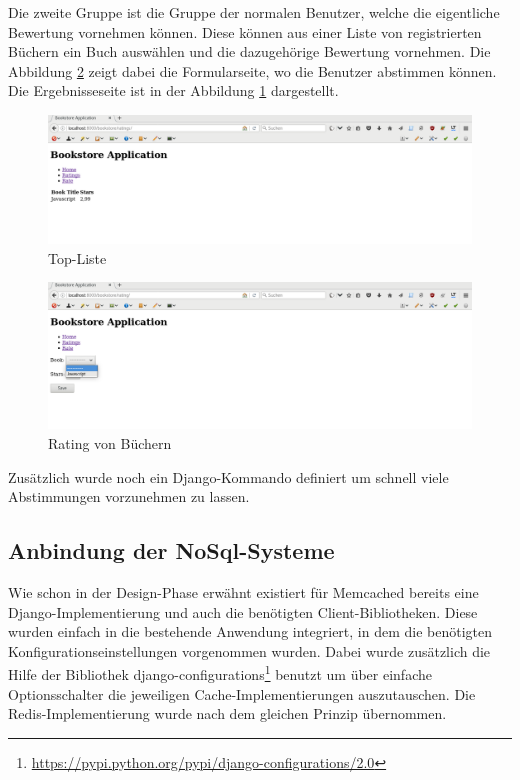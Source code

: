 Die zweite Gruppe ist die Gruppe der normalen Benutzer, welche die eigentliche
Bewertung vornehmen können. Diese können aus einer Liste von registrierten
Büchern ein Buch auswählen und die dazugehörige Bewertung vornehmen. Die
Abbildung \ref{fig:django-rate} zeigt dabei die Formularseite, wo die Benutzer 
abstimmen können. Die Ergebnisseseite ist in der Abbildung \ref{fig:django-list}
dargestellt.

\begin{figure}
\centering
\includegraphics[scale=0.25]{images/Ratings.png}
\caption{Top-Liste}
\label{fig:django-list}
\end{figure}

\begin{figure}
\centering
\includegraphics[scale=0.25]{images/Rating.png}
\caption{Rating von Büchern}
\label{fig:django-rate}
\end{figure}

Zusätzlich wurde noch ein Django-Kommando definiert um schnell viele Abstimmungen
vorzunehmen zu lassen.

\subsection{Anbindung der NoSql-Systeme}
Wie schon in der Design-Phase erwähnt existiert für Memcached bereits eine
Django-Implementierung und auch die benötigten Client-Bibliotheken. Diese wurden
einfach in die bestehende Anwendung integriert, in dem die benötigten
Konfigurationseinstellungen vorgenommen wurden. Dabei wurde zusätzlich die Hilfe
der Bibliothek django-configurations\footnote{\url{https://pypi.python.org/pypi/django-configurations/2.0}}
benutzt um über einfache Optionsschalter die jeweiligen Cache-Implementierungen
auszutauschen. Die Redis-Implementierung wurde nach dem gleichen Prinzip
übernommen.

